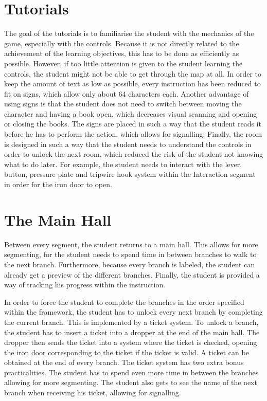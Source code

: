 \documentclass[11pt,twoside]{report} %
\begin{document}
\section{Tutorials}

The goal of the tutorials is to familiarise the student with the mechanics of the game, especially with the controls. Because it is not directly related to the achievement of the learning objectives, this has to be done as efficiently as possible. However, if too little attention is given to the student learning the controls, the student might not be able to get through the map at all. In order to keep the amount of text as low as possible, every instruction has been reduced to fit on signs, which allow only about 64 characters each. Another advantage of using signs is that the student does not need to switch between moving the character and having a book open, which decreases visual scanning and opening or closing the books. The signs are placed in such a way that the student reads it before he has to perform the action, which allows for signalling. Finally, the room is designed in such a way that the student needs to understand the controls in order to unlock the next room, which reduced the risk of the student not knowing what to do later. For example, the student needs to interact with the lever, button, pressure plate and tripwire hook system within the Interaction segment in order for the iron door to open.

\section{The Main Hall}

Between every segment, the student returns to a main hall. This allows for more segmenting, for the student needs to spend time in between branches to walk to the next branch. Furthermore, because every branch is labeled, the student can already get a preview of the different branches. Finally, the student is provided a way of tracking his progress within the instruction.

In order to force the student to complete the branches in the order specified within the framework, the student has to unlock every next branch by completing the current branch. This is implemented by a ticket system. To unlock a branch, the student has to insert a ticket into a dropper at the end of the main hall. The dropper then sends the ticket into a system where the ticket is checked, opening the iron door corresponding to the ticket if the ticket is valid. A ticket can be obtained at the end of every branch. The ticket system has two extra bonus practicalities. The student has to spend even more time in between the branches allowing for more segmenting. The student also gets to see the name of the next branch when receiving his ticket, allowing for signalling.
\end{document}
